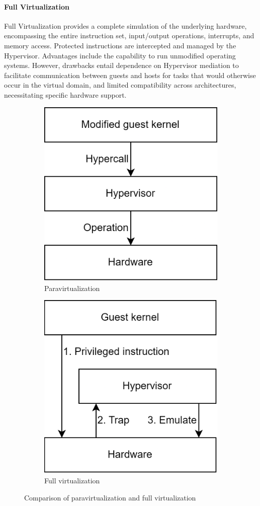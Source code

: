\paragraph*{Full Virtualization}
Full Virtualization provides a complete simulation of the underlying hardware, encompassing the entire instruction set, input/output operations, interrupts, and memory access. 
Protected instructions are intercepted and managed by the Hypervisor.
Advantages include the capability to run unmodified operating systems. 
However, drawbacks entail dependence on Hypervisor mediation to facilitate communication between guests and hosts for tasks that would otherwise occur in the virtual domain, and limited compatibility across architectures, necessitating specific hardware support.
\begin{figure}[H]
    \centering
    \begin{subfigure}{0.49\textwidth}
        \centering
        \includegraphics[width=0.75\linewidth]{images/para.png} 
        \caption{Paravirtualization}
    \end{subfigure}
    \begin{subfigure}{0.49\textwidth}
        \centering
        \includegraphics[width=0.75\linewidth]{images/full.png}
        \caption{Full virtualization}
    \end{subfigure}
    \caption{Comparison of paravirtualization and full virtualization}
\end{figure}

